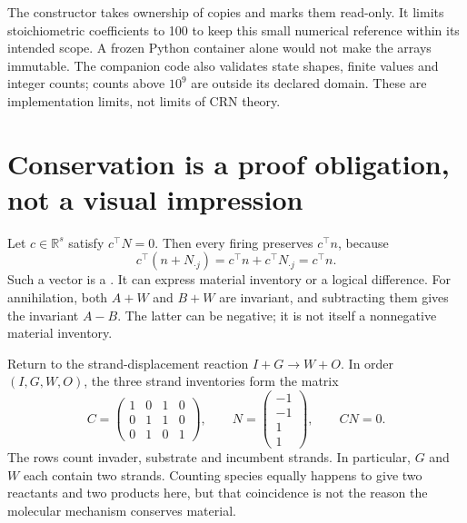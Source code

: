 
The constructor takes ownership of copies and marks them read-only. It limits
stoichiometric coefficients to 100 to keep this small numerical reference
within its intended scope. A frozen Python container alone would not make
the arrays immutable. The companion code also validates state shapes, finite
values and integer counts; counts above $10^9$ are outside its declared domain.
These are implementation limits, not limits of CRN theory.

\section{Conservation is a proof obligation, not a visual impression}

Let $c\in\mathbb R^s$ satisfy $c^\top N=0$. Then every firing preserves
$c^\top n$, because
\begin{equation}
 c^\top(n+N_{\cdot j})=c^\top n+c^\top N_{\cdot j}=c^\top n.
\end{equation}
Such a vector is a . It can express material inventory
or a logical difference. For annihilation, both $A+W$ and $B+W$ are invariant,
and subtracting them gives the invariant $A-B$. The latter can be negative;
it is not itself a nonnegative material inventory.

Return to the strand-displacement reaction $I+G\rightarrow W+O$.
In order $(I,G,W,O)$, the three strand inventories form the matrix
\begin{equation}
 C=
 \begin{pmatrix}
 1&0&1&0\\
 0&1&1&0\\
 0&1&0&1
 \end{pmatrix},
 \qquad
 N=\begin{pmatrix}-1\\-1\\1\\1\end{pmatrix},
 \qquad CN=0.
\end{equation}
The rows count invader, substrate and incumbent strands. In particular,
$G$ and $W$ each contain two strands. Counting species equally happens to
give two reactants and two products here, but that coincidence is not the
reason the molecular mechanism conserves material.

